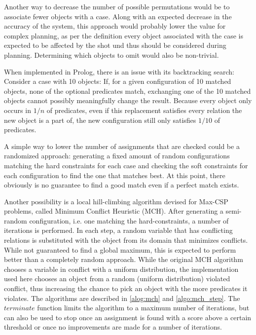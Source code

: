 Another way to decrease the number of possible permutations would be to associate fewer objects with a case. Along with an expected decrease in the accuracy of the system, this approach would probably lower the value for complex planning, as per the definition every object associated with the case is expected to be affected by the shot und thus should be considered during planning.
Determining which objects to omit would also be non-trivial.

When implemented in Prolog, there is an issue with its backtracking search: Consider a case with 10 objects: If, for a given configuration of 10 matched objects, none of the optional predicates match, exchanging one of the 10 matched objects cannot possibly meaningfully change the result.
Because every object only occurs in $1/n$ of predicates, even if this replacement satisfies every relation the new object is a part of, the new configuration still only satisfies $1/10$ of predicates.

A simple way to lower the number of assignments that are checked could be a randomized approach: generating a fixed amount of random configurations matching the hard constraints for each case and checking the soft constraints for each configuration to find the one that matches best.
At this point, there obviously is no guarantee to find a good match even if a perfect match exists.

Another possibility is a local hill-climbing algorithm devised for Max-CSP problems, called Minimum Conflict Heuristic (MCH)\cite{Minton1992MinimizingCA}. After generating a semi-random configuration, i.e. one matching the hard-constraints, a number of iterations is performed. In each step, a random variable that has conflicting relations is substituted with the object from its domain that minimizes conflicts. While not guaranteed to find a global maximum, this is expected to perform better than a completely random approach.
While the original MCH algorithm chooses a variable in conflict with a uniform distribution, the implementation used here chooses an object from a random (uniform distribution) violated conflict, thus increasing the chance to pick an object with the more predicates it violates. The algorithms are described in \ref{alog:mch} and \ref{algo:mch_step}.
The $terminate$ function limits the algorithm to a maximum number of iterations, but can also be used to stop once an assignment is found with a score above a certain threshold or once no improvements are made for a number of iterations.

